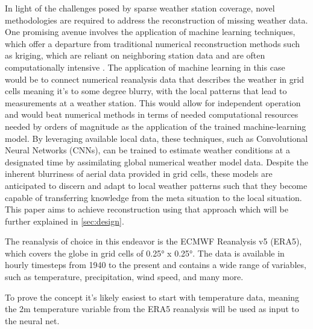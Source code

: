 In light of the challenges posed by sparse weather station coverage, novel methodologies are required to address the reconstruction of missing weather data. One promising avenue involves the application of machine learning techniques, which offer a departure from traditional numerical reconstruction methods such as kriging, which are reliant on neighboring station data and are often computationally intensive \cite{chung2019kriging}. The application of machine learning in this case would be to connect numerical reanalysis data that describes the weather in grid cells meaning it's to some degree blurry, with the local patterns that lead to measurements at a weather station. This would allow for independent operation and would beat numerical methods in terms of needed computational resources needed by orders of magnitude \cite{kurth2023MLperformance,bi2023MLperformance,lam2023MLperformance} as the application of the trained machine-learning model. By leveraging available local data, these techniques, such as Convolutional Neural Networks (CNNs), can be trained to estimate weather conditions at a designated time by assimilating global numerical weather model data. Despite the inherent blurriness of aerial data provided in grid cells, these models are anticipated to discern and adapt to local weather patterns such that they become capable of transferring knowledge from the meta situation to the local situation. This paper aims to achieve reconstruction using that approach which will be further explained in \autoref{sec:design}.


The reanalysis of choice in this endeavor is the ECMWF Reanalysis v5 (ERA5), which covers the globe in grid cells of 0.25° x 0.25°. The data is available in hourly timesteps from 1940 to the present and contains a wide range of variables, such as temperature, precipitation, wind speed, and many more.


To prove the concept it's likely easiest to start with temperature data, meaning the 2m temperature variable from the ERA5 reanalysis will be used as input to the neural net.

